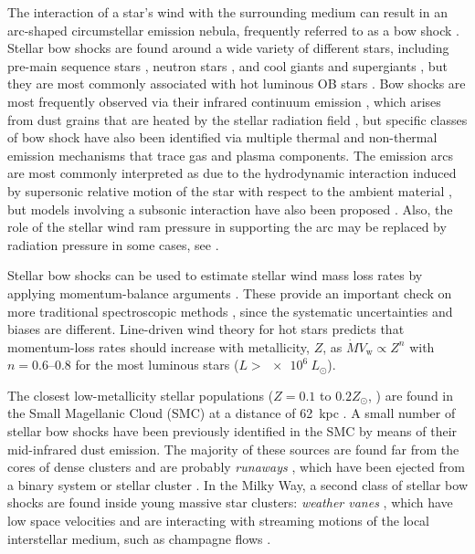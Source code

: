 \documentclass[twocolumn, times]{aastex631}
\newcommand{\wind}{\ensuremath{_{\text{w}}}}
\begin{document}
The interaction of a star's wind with the surrounding medium
can result in an arc-shaped circumstellar emission nebula,
frequently referred to as a bow shock \citep{Gull:1979a, van-Buren:1988a}.
Stellar bow shocks are found around a wide variety of different stars,
including pre-main sequence stars \citep{Bally:2001a, Henney:2013a},
neutron stars \citep{Cordes:1993a},
and cool giants and supergiants \citep{Sahai:2010a, Cox:2012a},
but they are most commonly associated with hot luminous OB stars
\citep{van-Buren:1995a, Kobulnicky:2016a}.
Bow shocks are most frequently observed via their infrared continuum emission
\citep{Meyer:2016a},
which arises from dust grains that are heated by the
stellar radiation field \citep{Draine:2007a},
but specific classes of bow shock have also been identified
via multiple thermal and non-thermal emission mechanisms
that trace gas and plasma components.
The emission arcs are most commonly interpreted as due to
the hydrodynamic interaction induced by
supersonic relative motion of the star with respect to the ambient material
\citep{Wilkin:1996a},
but models involving a subsonic interaction have also been proposed
\citep{Mackey:2015a, Mackey:2016a}.
Also, the role of the stellar wind ram pressure in supporting the arc
may be replaced by radiation pressure in some cases, see
\citet{Henney:2019a, Henney:2019b, Henney:2019c}. 

Stellar bow shocks can be used to estimate stellar wind mass loss rates
by applying momentum-balance arguments
\citep{Gvaramadze:2012a, Kobulnicky:2018a, Kobulnicky:2019a, Henney:2019c}.
These provide an important check on more traditional spectroscopic methods
\citep{Hillier:2020v},
since the systematic uncertainties and biases are different.
Line-driven wind theory for hot stars
predicts that momentum-loss rates should increase with metallicity, \(Z\),
as \(\dot{M} V\wind \propto Z^{n}\) with \(n = 0.6\)--\(0.8\)
\citep{Vink:2001a, Krticka:2018a, Vink:2021h, Bjorklund:2021k}
for the most luminous stars (\(L > \SI{e6}{L_\odot}\)).

The closest low-metallicity stellar populations
(\(Z = 0.1\)  to \(0.2 Z_\odot\), \citealp{Narloch:2021t})
are found in the Small Magellanic Cloud (SMC) at a distance of
\SI{62}{kpc} \citep{Graczyk:2020g}.
A small number of stellar bow shocks have been
previously identified in the SMC
\citep{Gvaramadze:2011b, Sheets:2013v}
by means of their mid-infrared dust emission.
The majority of these sources are found far from
the cores of dense clusters and are probably \emph{runaways} \citep{Blaauw:1961a},
which have been ejected from a binary system or stellar cluster
\citep{Hoogerwerf:2001a, Renzo:2019b}. 
In the Milky Way, a second class of stellar bow shocks are found
inside young massive star clusters: \emph{weather vanes} \citep{Povich:2008a},
which have low space velocities and are interacting
with streaming motions of the local interstellar medium,
such as champagne flows \citep{Tenorio-Tagle:1979a}.
\end{document}

